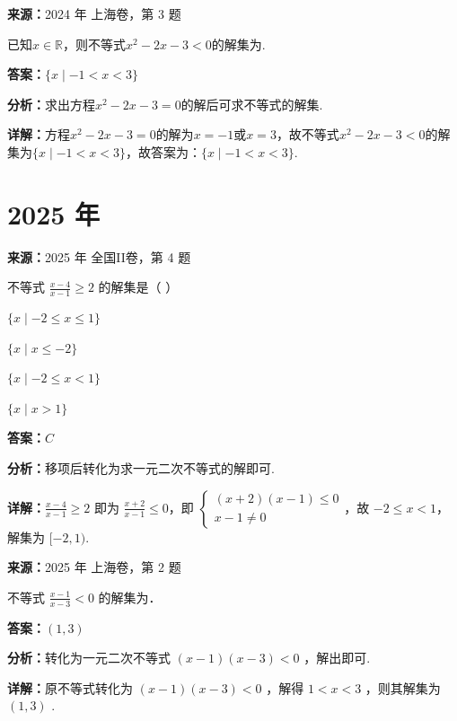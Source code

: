 \begin{question}[points=4]
\textbf{来源：}2024 年 上海卷，第 3 题\par
已知$x\in\mathbb{R}$，则不等式$x^2-2x-3<0$的解集为.
\fillin[{$\{x\mid -1<x<3\}$}]
\begin{solution}
\textbf{答案：}$\{x\mid -1<x<3\}$

\textbf{分析：}求出方程$x^2-2x-3=0$的解后可求不等式的解集.

\textbf{详解：}方程$x^2-2x-3=0$的解为$x=-1$或$x=3$，故不等式$x^2-2x-3<0$的解集为$\{x\mid -1<x<3\}$，故答案为：$\{x\mid -1<x<3\}$.
\end{solution}
\end{question}

\section*{2025 年}

\begin{question}[points=5]
\textbf{来源：}2025 年 全国II卷，第 4 题\par
不等式 $\frac{x-4}{x-1}\ge 2$ 的解集是（ ）
\begin{choices}
  \item $\{x\mid -2\le x\le 1\}$
  \item $\{x\mid x\le -2\}$
  \item $\{x\mid -2\le x<1\}$
  \item $\{x\mid x>1\}$
\end{choices}
\begin{solution}
\textbf{答案：}$C$

\textbf{分析：}移项后转化为求一元二次不等式的解即可.

\textbf{详解：}$\frac{x-4}{x-1}\ge 2$ 即为 $\frac{x+2}{x-1}\le 0$，即 $\begin{cases}(x+2)(x-1)\le 0\\x-1\neq 0\end{cases}$，故 $-2\le x<1$，解集为 $[-2,1)$.
\end{solution}
\end{question}

\begin{question}[points=4]
\textbf{来源：}2025 年 上海卷，第 2 题\par
不等式 $\frac{x-1}{x-3} < 0$ 的解集为．
\fillin[{$(1,3)$}]
\begin{solution}
\textbf{答案：}$(1,3)$

\textbf{分析：}转化为一元二次不等式 $(x-1)(x-3) < 0$ ，解出即可.

\textbf{详解：}原不等式转化为 $(x-1)(x-3) < 0$ ，解得 $1 < x < 3$ ，则其解集为 $(1,3)$ .
\end{solution}
\end{question}

